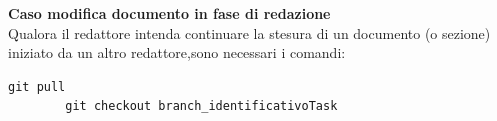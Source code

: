 \documentclass{article}
\begin{document}

    \textbf{Caso modifica documento in fase di redazione}\\
   Qualora il redattore intenda continuare la stesura di un documento (o sezione) iniziato da un altro redattore,sono necessari i comandi:

        \begin{lstlisting}[style=code]
        git pull
        git checkout branch_identificativoTask

        \end{lstlisting}
\end{document}
